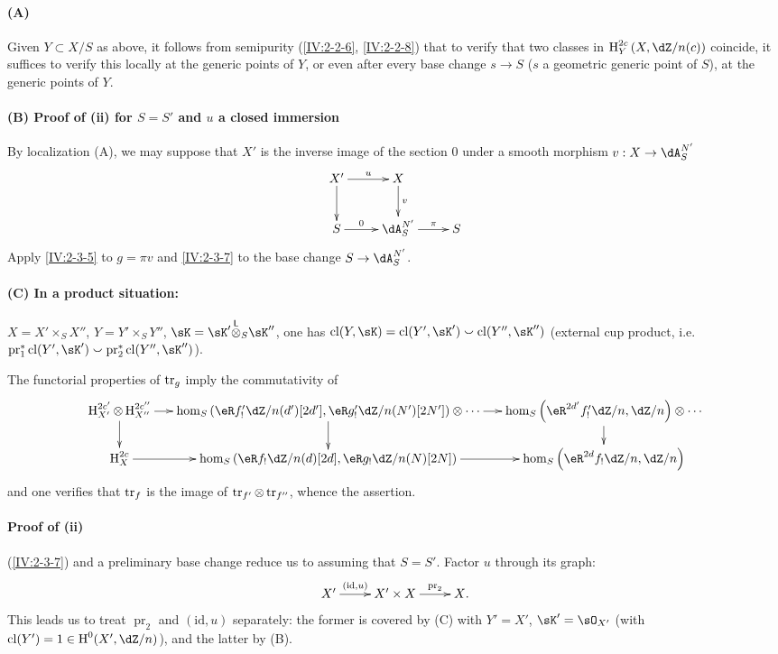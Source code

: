 \paragraph{(A)}
Given $Y\subset X/S$ as above, it follows from semipurity
(\ref{IV:2-2-6}, \ref{IV:2-2-8}) that to verify that two classes in
$\h_Y^{2 c}\left(X,\dZ/n(c)\right)$ coincide, it suffices to verify this
locally at the generic points of $Y$, or even after every base change
$s\to S$ ($s$ a geometric generic point of $S$), at the generic points of
$Y$.

\paragraph{(B) Proof of (ii) for $S=S'$ and $u$ a closed immersion}
By localization (A), we may suppose that $X'$ is the inverse image of the
section $0$ under a smooth morphism $v:X\to \dA_S^{N'}$
\[\xymatrix{
  X' \ar[r]^-u \ar[d]
    & X \ar[d]^-v \\
  S \ar[r]^-0
    & \dA_S^{N'} \ar[r]^-\pi
    & S
}\]
Apply \ref{IV:2-3-5} to $g=\pi v$ and \ref{IV:2-3-7} to the base change
$S\to \dA_S^{N'}$.

\paragraph{(C) In a product situation:}
$X=X'\times_S X''$, $Y=Y'\times_S Y''$, $\sK=\sK'\lotimes_S \sK''$, one has
$\cl(Y,\sK) = \cl(Y',\sK')\smallsmile \cl(Y'',\sK'')$ (external cup product,
i.e. $\operatorname{pr}_1^\ast \cl(Y',\sK')\smallsmile \operatorname{pr}_2^\ast \cl(Y'',\sK'')$).

The functorial properties of $\operatorname{tr}_g$ \cite[XVIII.2.12]{sga4} imply the
commutativity of
\small
\[\xymatrix@=0.5cm{
  \h_{X'}^{2c'}\otimes \h_{X''}^{2 c''}\ar[r] \ar[d]
    & \hom_S\left(\eR f_!' \dZ/n(d')[2 d'],\eR g_!'\dZ/n(N')[2 N']\right)\otimes \cdots \ar[r] \ar[d]
    & \hom_S\left(\eR^{2 d'} f_!' \dZ/n,\dZ/n\right) \otimes \cdots \ar[d] \\
  \h_X^{2 c} \ar[r]
    & \hom_S\left(\eR f_!\dZ/n(d)[2 d],\eR g_!\dZ/n(N)[2 N]\right) \ar[r]
    & \hom_S\left(\eR^{2 d}f_!\dZ/n,\dZ/n\right)
}\]
\normalsize
and one verifies that $\operatorname{tr}_f$ is the image of
$\operatorname{tr}_{f'}\otimes \operatorname{tr}_{f''}$, whence the assertion.

\paragraph{Proof of (ii)}
(\ref{IV:2-3-7}) and a preliminary base change reduce us to assuming that
$S=S'$. Factor $u$ through its graph:
\[\xymatrix{
  X' \ar[r]^-{(\text{id},u)}
    & X'\times X \ar[r]^-{\operatorname{pr}_2}
    & X \text{.}
}\]
This leads us to treat $\operatorname{pr}_2$ and $(\text{id},u)$ separately:
the former is covered by (C) with $Y'=X'$, $\sK'=\sO_{X'}$ (with
$\cl(Y')=1\in \h^0(X',\dZ/n)$), and the latter by (B).

